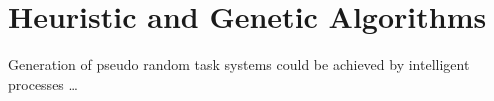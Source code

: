 \section{Heuristic and Genetic Algorithms}

Generation of pseudo random task systems could be achieved by intelligent processes \dots


